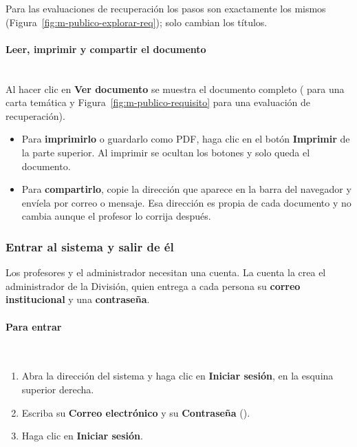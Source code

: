 Para las evaluaciones de recuperación los pasos son exactamente los mismos (Figura~\ref{fig:m-publico-explorar-req}); solo cambian los títulos.


\paragraph{Leer, imprimir y compartir el documento}\mbox{}\\
Al hacer clic en \textbf{Ver documento} se muestra el documento completo ( para una carta temática y Figura~\ref{fig:m-publico-requisito} para una evaluación de recuperación).

\begin{itemize}
    \item Para \textbf{imprimirlo} o guardarlo como PDF, haga clic en el botón \textbf{Imprimir} de la parte superior. Al imprimir se ocultan los botones y solo queda el documento.
    \item Para \textbf{compartirlo}, copie la dirección que aparece en la barra del navegador y envíela por correo o mensaje. Esa dirección es propia de cada documento y no cambia aunque el profesor lo corrija después.
\end{itemize}


\subsubsection{Entrar al sistema y salir de él}\label{apx:manual-user:acceso}

Los profesores y el administrador necesitan una cuenta. La cuenta la crea el administrador de la División, quien entrega a cada persona su \textbf{correo institucional} y una \textbf{contraseña}.

\paragraph{Para entrar}\mbox{}\\
\begin{enumerate}
    \item Abra la dirección del sistema y haga clic en \textbf{Iniciar sesión}, en la esquina superior derecha.
    \item Escriba su \textbf{Correo electrónico} y su \textbf{Contraseña} ().
    \item Haga clic en \textbf{Iniciar sesión}.
\end{enumerate}

